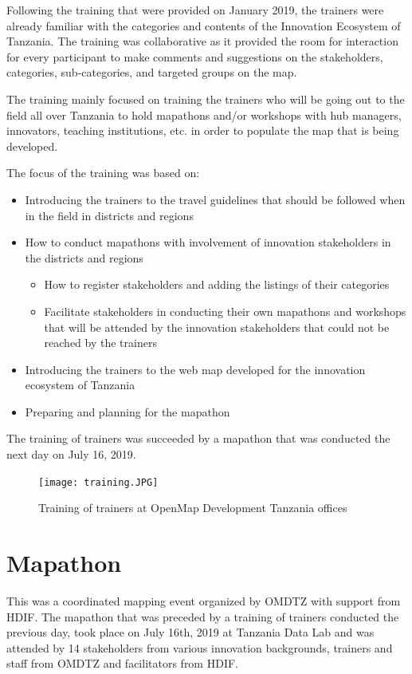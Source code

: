 \documentclass[a4paper,12pt,twoside]{article}
\begin{document}
Following the training that were provided on January 2019, the trainers were already familiar with the categories and contents of the Innovation Ecosystem of Tanzania. The training was collaborative as it provided the room for interaction for every participant to make comments and suggestions on the stakeholders, categories, sub-categories, and targeted groups on the map. 

The training mainly focused on training the trainers who will be going out to the field all over Tanzania to hold mapathons and/or workshops with hub managers, innovators, teaching institutions, etc. in order to populate the map that is being developed.

The focus of the training was based on:

\begin{itemize}
	\item Introducing the trainers to the travel guidelines that should be followed when in the field in districts and regions
	\item How to conduct mapathons with involvement of innovation stakeholders in the districts and regions
	\begin{itemize}
		\item How to register stakeholders and adding the listings of their categories
		\item Facilitate stakeholders in conducting their own mapathons and workshops that will be attended by the innovation stakeholders that could not be reached by the trainers
	\end{itemize}
	\item Introducing the trainers to the web map developed for the innovation ecosystem of Tanzania
	\item Preparing and planning for the mapathon
\end{itemize}

The training of trainers was succeeded by a mapathon that was conducted the next day on July 16, 2019.

\begin{figure}[H] %
	\centering
	\caption{Training of trainers at OpenMap Development Tanzania offices}
	\texttt{[image: training.JPG]}
\end{figure}

\section{Mapathon}
This was a coordinated mapping event organized by OMDTZ with support from HDIF. The mapathon that was preceded by a training of trainers conducted the previous day, took place on July 16th, 2019 at Tanzania Data Lab and was attended by 14 stakeholders from various innovation backgrounds, trainers and staff from OMDTZ and facilitators from HDIF.
\end{document}
